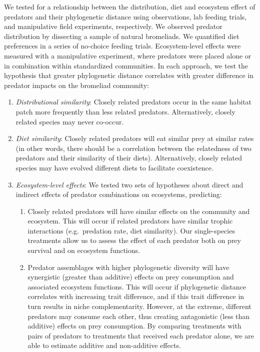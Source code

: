 We tested for a relationship between the distribution, diet and
ecosystem effect of predators and their phylogenetic distance using
observations, lab feeding trials, and manipulative field experiments,
respectively. We observed predator distribution by dissecting a sample
of natural bromeliads. We quantified diet preferences in a series of
no-choice feeding trials. Ecosystem-level effects were measured with a
manipulative experiment, where predators were placed alone or in
combination within standardized communities. In each approach, we test
the hypothesis that greater phylogenetic distance correlates with
greater difference in predator impacts on the bromeliad community:

\begin{enumerate}
\def\labelenumi{\arabic{enumi}.}
\item
  \emph{Distributional similarity}: Closely related predators occur in
  the same habitat patch more frequently than less related predators.
  Alternatively, closely related species may never co-occur.
\item
  \emph{Diet similarity}: Closely related predators will eat similar
  prey at similar rates (in other words, there should be a correlation between the relatedness of two predators and their similarity of their diets). Alternatively, closely related species may have
  evolved different diets to facilitate coexistence.
\item
  \emph{Ecosystem-level effects}: We tested two sets of hypotheses about
  direct and indirect effects of predator combinations on ecosystems,
  predicting:

  \begin{enumerate}
  \def\labelenumii{(\alph{enumii})}
  \item
    Closely related predators will have similar effects on the
    community and ecosystem. This will occur if related predators have similar trophic
    interactions (e.g.~predation rate, diet similarity). Our
    single-species treatments allow us to assess the effect of each
    predator both on prey survival and on ecosystem functions.
  \item
    Predator assemblages with higher phylogenetic diversity will have
    synergistic (greater than additive) effects on prey consumption and
    associated ecosystem functions. This will occur if phylogenetic
    distance correlates with increasing trait difference, and if this
    trait difference in turn results in niche complementarity. However,
    at the extreme, different predators may consume each other, thus
    creating antagonistic (less than additive) effects on prey
    consumption. By comparing treatments with pairs of predators to
    treatments that received each predator alone, we are able to
    estimate additive and non-additive effects.
  \end{enumerate}
\end{enumerate}


